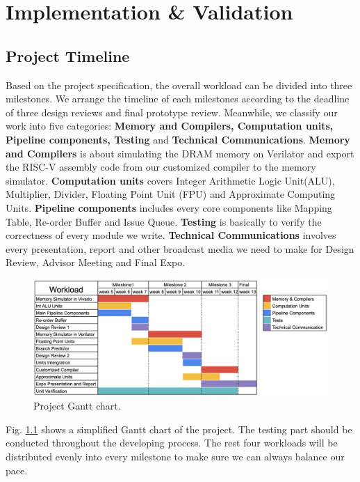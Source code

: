 
\let\clearpage\relax
\chapter{Implementation \& Validation}

\section{Project Timeline} %
Based on the project specification, the overall workload can be divided into three milestones. We arrange the timeline of each milestones according to the deadline of three design reviews and final prototype review. Meanwhile, we classify our work into five categories: \textbf{Memory and Compilers, Computation units, Pipeline components, Testing} and \textbf{Technical Communications}. \textbf{Memory and Compilers} is about simulating the DRAM memory on Verilator and export the RISC-V assembly code from our customized compiler to the memory simulator. \textbf{Computation units} covers Integer Arithmetic Logic Unit(ALU), Multiplier, Divider, Floating Point Unit (FPU) and Approximate Computing Units. \textbf{Pipeline components} includes every core components like Mapping Table, Re-order Buffer and Issue Queue. \textbf{Testing} is basically to verify the correctness of every module we write. \textbf{Technical Communications} involves every presentation, report and other broadcast media we need to make for Design Review, Advisor Meeting and Final Expo.
\begin{figure}[!htp]
    \centering
    \includegraphics[width=0.8\linewidth]{figure/gantt.png}
    \caption{Project Gantt chart.}
    \label{gantt}
\end{figure}
Fig. \ref{gantt} shows a simplified Gantt chart of the project. The testing part should be conducted throughout the developing process. The rest four workloads will be distributed evenly into every milestone to make sure we can always balance our pace. 

